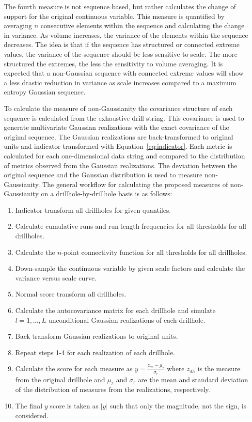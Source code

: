 The fourth measure is not sequence based, but rather calculates the change of support for the original continuous variable. This measure is quantified by averaging $n$ consecutive elements within the sequence and calculating the change in variance. As volume increases, the variance of the elements within the sequence decreases. The idea is that if the sequence has structured or connected extreme values, the variance of the sequence should be less sensitive to scale. The more structured the extremes, the less the sensitivity to volume averaging. It is expected that a non-Gaussian sequence with connected extreme values will show a less drastic reduction in variance as scale increases compared to a maximum entropy Gaussian sequence.

To calculate the measure of non-Gaussianity the covariance structure of each sequence is calculated from the exhaustive drill string. This covariance is used to generate multivariate Gaussian realizations with the exact covariance of the original sequence. The Gaussian realizations are back-transformed to original units and indicator transformed with Equation~\ref{eq:indicator}. Each metric is calculated for each one-dimensional data string and compared to the distribution of metrics observed from the Gaussian realizations. The deviation between the original sequence and the Gaussian distribution is used to measure non-Gaussianity. The general workflow for calculating the proposed measures of non-Gaussianity on a drillhole-by-drillhole basis is as follows:
\begin{enumerate}[noitemsep]
    \item Indicator transform all drillholes for given quantiles.
    \item Calculate cumulative runs and run-length frequencies for all thresholds for all drillholes.
    \item Calculate the $n$-point connectivity function for all thresholds for all drillholes.
    \item Down-sample the continuous variable by given scale factors and calculate the variance versus scale curve.
    \item Normal score transform all drillholes.
    \item Calculate the autocovariance matrix for each drillhole and simulate $l=1,\dots,L$ unconditional Gaussian realizations of each drillhole.
    \item Back transform Gaussian realizations to original units.
    \item Repeat steps 1-4 for each realization of each drillhole.
    \item Calculate the score for each measure as $y = \frac{z_{dh}-\mu_{r}}{\sigma_{r}}$ where $z_{dh}$ is the measure from the original drillhole and $\mu_{r}$ and $\sigma_{r}$ are the mean and standard deviation of the distribution of measures from the realizations, respectively.
    \item The final $y$ score is taken as $\lvert y \rvert$ such that only the magnitude, not the sign, is considered.
\end{enumerate}


